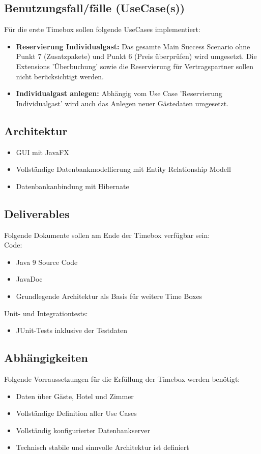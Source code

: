 \documentclass[../Pflichtenheft.tex]{subfiles}
\begin{document}
    \subsection{Benutzungsfall/fälle (UseCase(s)) }
        Für die erste Timebox sollen folgende UseCases implementiert:
        \begin{itemize}
            \item \textbf{Reservierung Individualgast: } Das gesamte Main Success Scenario ohne Punkt
            7 (Zusatzpakete) und Punkt 6 (Preis überprüfen) wird umgesetzt. Die Extensions 'Überbuchung'
            sowie die Reservierung für Vertragspartner sollen nicht berücksichtigt werden.
            \item \textbf{Individualgast anlegen: } Abhängig vom Use Case 'Reservierung Individualgast' wird
            auch das Anlegen neuer Gästedaten umgesetzt.
        \end{itemize}
    \subsection{Architektur}
    \begin{itemize}
        \item GUI mit JavaFX
        \item Vollständige Datenbankmodellierung mit Entity Relationship Modell
        \item Datenbankanbindung mit Hibernate
    \end{itemize}
    \subsection{Deliverables}
    Folgende Dokumente sollen am Ende der Timebox verfügbar sein: \\
    Code:
    \begin{itemize}
        \item Java 9 Source Code
        \item JavaDoc
        \item Grundlegende Architektur als Basis für weitere Time Boxes
    \end{itemize}
    Unit- und Integrationtests:
    \begin{itemize}
        \item JUnit-Tests inklusive der Testdaten
    \end{itemize}
    \subsection{Abhängigkeiten}
    Folgende Vorraussetzungen für die Erfüllung der Timebox werden benötigt:
    \begin{itemize}
        \item Daten über Gäste, Hotel und Zimmer
        \item Vollständige Definition aller Use Cases
        \item Vollständig konfigurierter Datenbankserver
        \item Technisch stabile und sinnvolle Architektur ist definiert
    \end{itemize}
\end{document}

